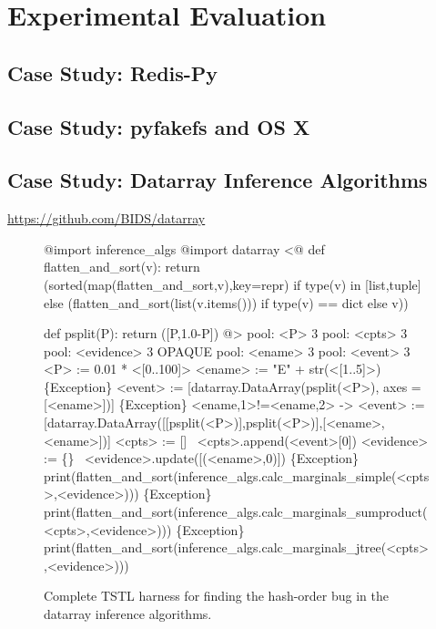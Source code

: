 \section{Experimental Evaluation}

\subsection {Case Study: Redis-Py}

\subsection {Case Study: pyfakefs and OS X}

\subsection{Case Study: Datarray Inference Algorithms}

\url{https://github.com/BIDS/datarray}

\begin{figure*}
{\scriptsize
\begin{code}
@import inference\_algs
@import datarray
\vspace{0.1in}
<@
def flatten\_and\_sort(v):
    return (sorted(map(flatten\_and\_sort,v),key=repr) if type(v) in [list,tuple] else
                (flatten\_and\_sort(list(v.items())) if type(v) == dict else v))

def psplit(P):
    return ([P,1.0-P])
@>
\vspace{0.1in}
pool: <P> 3
pool: <cpts> 3
pool: <evidence> 3 OPAQUE
pool: <ename> 3
pool: <event> 3
\vspace{0.1in}
<P> := 0.01 * <[0..100]>
\vspace{0.1in}
<ename> := "E" + str(<[1..5]>)
\vspace{0.1in}
\{Exception\} <event> := [datarray.DataArray(psplit(<P>), axes = [<ename>])]
\{Exception\} <ename,1>!=<ename,2> -> <event> := [datarray.DataArray([[psplit(<P>)],psplit(<P>)],[<ename>,<ename>])]
\vspace{0.1in}
<cpts> := []
~<cpts>.append(<event>[0])
\vspace{0.1in}
<evidence> := \{\}
~<evidence>.update([(<ename>,0)])
\vspace{0.1in}
\{Exception\} print(flatten\_and\_sort(inference\_algs.calc\_marginals\_simple(<cpts>,<evidence>)))
\{Exception\} print(flatten\_and\_sort(inference\_algs.calc\_marginals\_sumproduct(<cpts>,<evidence>)))
\{Exception\} print(flatten\_and\_sort(inference\_algs.calc\_marginals\_jtree(<cpts>,<evidence>)))
\end{code}
}
\caption {Complete TSTL harness for finding the hash-order bug in the datarray
  inference algorithms.}
\label{hashbug}
\end{figure*}